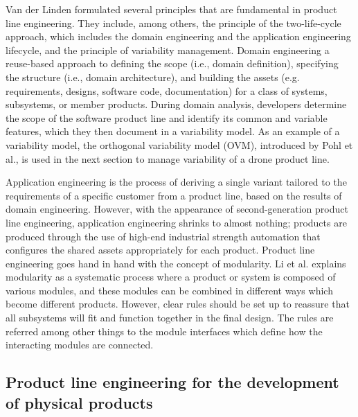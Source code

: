 \documentclass[sigconf,review]{acmart}
\begin{document}
Van der Linden formulated several principles that are fundamental in product line engineering. 
They include, among others, the principle of the two-life-cycle approach, which includes the domain engineering and the application engineering lifecycle, and the principle of variability management.
Domain engineering a reuse-based approach to defining the scope (i.e., domain definition), specifying the structure (i.e., domain architecture), and building the assets (e.g. requirements, designs, software code, documentation) for a class of systems, subsystems, or member products.
During domain analysis, developers determine the scope of the software product line and identify its common and variable features, which they then document in a variability model.
As an example of a variability model, the orthogonal variability model (OVM), introduced by Pohl et al., is used in the next section to manage variability of a drone product line. 

Application engineering is the process of deriving a single variant tailored to the requirements of a specific customer from a product line, based on the results of domain engineering. 
However, with the appearance of second-generation product line engineering, application engineering shrinks to almost nothing; products are produced through the use of high-end industrial strength automation that configures the shared assets appropriately for each product.
Product line engineering goes hand in hand with the concept of modularity.
Li et al. explains modularity as a systematic process where a product or system is composed of various modules, and these modules can be combined in different ways which become different products.
However, clear rules should be set up to reassure that all subsystems will fit and function together in the final design.
The rules are referred among other things to the module interfaces which define how the interacting modules are connected.

\subsection{Product line engineering for the development of physical products}
\label{sec:modualarity}



\end{document}
